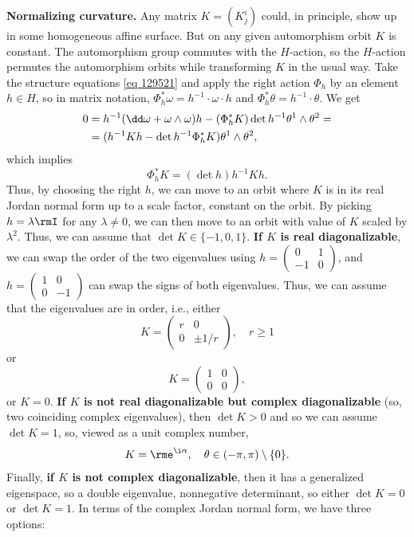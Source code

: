 \textbf{Normalizing curvature.} Any matrix $K=(K^i_j)$ could, in principle, show up in some homogeneous affine surface. But on any given automorphism orbit $K$ is constant. The automorphism group commutes with the $H$-action, so the $H$-action permutes the automorphism orbits while transforming $K$ in the usual way. Take the structure equations \eqref{eq 129521} and apply the right action $\Phi_h$ by an element $h\in H$, so in matrix notation, $\Phi_h^\ast\omega=h^{-1}\cdot \omega\cdot h$ and $\Phi_h^\ast\theta=h^{-1}\cdot\theta$. We get 
\begin{align}
    0&=h^{-1}(\dd\omega+\omega\wedge\omega)h-(\Phi^\ast_h K)\det h^{-1}\theta^1\wedge\theta^2=\notag\\
    &=(h^{-1} K h-\det h^{-1}\Phi_h^\ast K)\theta^1\wedge\theta^2,
\end{align}
which implies 
\[\Phi_h^\ast K=(\det h)h^{-1} K h.\]
Thus, by choosing the right $h$, we can move to an orbit where $ K$ is in its real Jordan normal form up to a scale factor, constant on the orbit. By picking $h=\lambda\rmI$ for any $\lambda\neq 0$, we can then move to an orbit with value of $ K$ scaled by $\lambda^2$. Thus, we can assume that $\det K\in \{-1,0,1\}$. \textbf{If $ K$ is real diagonalizable}, we can swap the order of the two eigenvalues using $h=\left(\begin{smallmatrix}
    0 & 1\\ -1 & 0
\end{smallmatrix}\right)$, and $h=\left(\begin{smallmatrix}
    1 & 0\\ 0 & -1
\end{smallmatrix}\right)$ can swap the signs of both eigenvalues. Thus, we can assume that the eigenvalues are in order, i.e., either 
\[ K=\begin{pmatrix}
    r & 0 \\ 0 & \pm 1/r
\end{pmatrix},\quad r\geq 1\]
or 
\[ K=\begin{pmatrix}
    1 & 0 \\ 0 & 0
\end{pmatrix},\]
or $ K=0$. \textbf{If $ K$ is not real diagonalizable but complex diagonalizable} (so, two coinciding complex eigenvalues), then $\det K>0$ and so we can assume $\det K=1$, so, viewed as a unit complex number,
\[K=\rme^{\i\alpha},\quad \theta\in (-\pi,\pi)\setminus\{0\}.\]
Finally, \textbf{if $ K$ is not complex diagonalizable}, then it has a generalized eigenspace, so a double eigenvalue, nonnegative determinant, so either $\det K=0$ or $\det K=1$. In terms of the complex Jordan normal form, we have three options:
